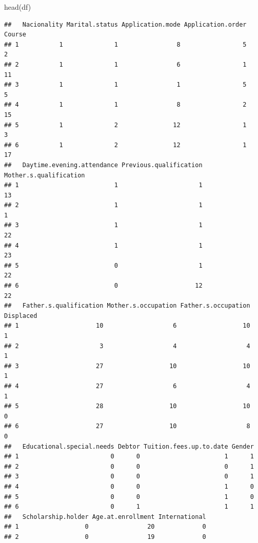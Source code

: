 \documentclass[
]{article}
\newenvironment{Shaded}{\begin{snugshade}}{\end{snugshade}}
\newcommand{\FunctionTok}[1]{\textcolor[rgb]{0.00,0.00,0.00}{#1}}
\newcommand{\NormalTok}[1]{#1}
\begin{document}
\begin{Shaded}
\begin{Highlighting}[]
\FunctionTok{head}\NormalTok{(df)}
\end{Highlighting}
\end{Shaded}

\begin{verbatim}
##   Nacionality Marital.status Application.mode Application.order Course
## 1           1              1                8                 5      2
## 2           1              1                6                 1     11
## 3           1              1                1                 5      5
## 4           1              1                8                 2     15
## 5           1              2               12                 1      3
## 6           1              2               12                 1     17
##   Daytime.evening.attendance Previous.qualification Mother.s.qualification
## 1                          1                      1                     13
## 2                          1                      1                      1
## 3                          1                      1                     22
## 4                          1                      1                     23
## 5                          0                      1                     22
## 6                          0                     12                     22
##   Father.s.qualification Mother.s.occupation Father.s.occupation Displaced
## 1                     10                   6                  10         1
## 2                      3                   4                   4         1
## 3                     27                  10                  10         1
## 4                     27                   6                   4         1
## 5                     28                  10                  10         0
## 6                     27                  10                   8         0
##   Educational.special.needs Debtor Tuition.fees.up.to.date Gender
## 1                         0      0                       1      1
## 2                         0      0                       0      1
## 3                         0      0                       0      1
## 4                         0      0                       1      0
## 5                         0      0                       1      0
## 6                         0      1                       1      1
##   Scholarship.holder Age.at.enrollment International
## 1                  0                20             0
## 2                  0                19             0

\end{verbatim}
\end{document}
